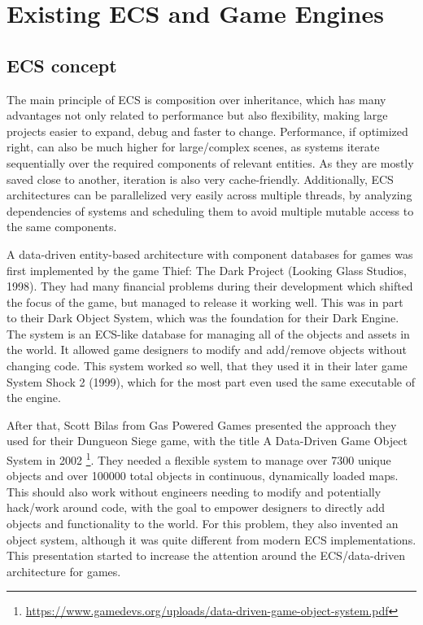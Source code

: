 \chapter{Existing ECS and Game Engines}\label{chap:engines}

\section{ECS concept}

The main principle of ECS is composition over inheritance, which has many advantages not only related to performance but also flexibility, making large projects easier to expand, debug and faster to change. Performance, if optimized right, can also be much higher for large/complex scenes, as systems iterate sequentially over the required components of relevant entities. As they are mostly saved close to another, iteration is also very cache-friendly. Additionally, ECS architectures can be parallelized very easily across multiple threads, by analyzing dependencies of systems and scheduling them to avoid multiple mutable access to the same components.

A data-driven entity-based architecture with component databases for games was first implemented by the game \textsf{Thief: The Dark Project} (Looking Glass Studios, 1998). They had many financial problems during their development which shifted the focus of the game, but managed to release it working well. This was in part to their \textsf{Dark Object System}, which was the foundation for their \textsf{Dark Engine}. The system is an ECS-like database for managing all of the objects and assets in the world. It allowed game designers to modify and add/remove objects without changing code. This system worked so well, that they used it in their later game \textsf{System Shock 2} (1999), which for the most part even used the same executable of the engine.

After that, Scott Bilas from \textsf{Gas Powered Games} presented the approach they used for their \textsf{Dungueon Siege} game, with the title \textsf{A Data-Driven Game Object System} in 2002 \footnote{\url{https://www.gamedevs.org/uploads/data-driven-game-object-system.pdf}}. They needed a flexible system to manage over 7300 unique objects and over 100000 total objects in continuous, dynamically loaded maps. This should also work without engineers needing to modify and potentially hack/work around code, with the goal to empower designers to directly add objects and functionality to the world. For this problem, they also invented an object system, although it was quite different from modern ECS implementations. This presentation started to increase the attention around the ECS/data-driven architecture for games.

